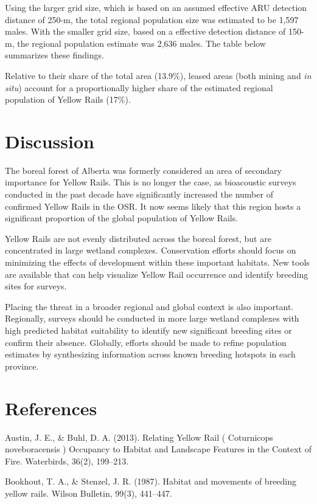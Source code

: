 \documentclass[11pt,]{article}
\begin{document}
Using the larger grid size, which is based on an assumed effective ARU
detection distance of 250-m, the total regional population size was
estimated to be 1,597 males. With the smaller grid size, based on a
effective detection distance of 150-m, the regional population estimate
was 2,636 males. The table below summarizes these findings.

Relative to their share of the total area (13.9\%), leased areas (both
mining and \emph{in situ}) account for a proportionally higher share of
the estimated regional population of Yellow Rails (17\%).

\section{Discussion}\label{discussion}

The boreal forest of Alberta was formerly considered an area of
secondary importance for Yellow Rails. This is no longer the case, as
bioacoustic surveys conducted in the past decade have significantly
increased the number of confirmed Yellow Rails in the OSR. It now seems
likely that this region hosts a significant proportion of the global
population of Yellow Rails.

Yellow Rails are not evenly distributed across the boreal forest, but
are concentrated in large wetland complexes. Conservation efforts should
focus on minimizing the effects of development within these important
habitats. New tools are available that can help visualize Yellow Rail
occurrence and identify breeding sites for surveys.

Placing the threat in a broader regional and global context is also
important. Regionally, surveys should be conducted in more large wetland
complexes with high predicted habitat suitability to identify new
significant breeding sites or confirm their absence. Globally, efforts
should be made to refine population estimates by synthesizing
information across known breeding hotspots in each province.

\section{References}\label{references}

Austin, J. E., \& Buhl, D. A. (2013). Relating Yellow Rail ( Coturnicops
noveboracensis ) Occupancy to Habitat and Landscape Features in the
Context of Fire. Waterbirds, 36(2), 199--213.

Bookhout, T. A., \& Stenzel, J. R. (1987). Habitat and movements of
breeding yellow rails. Wilson Bulletin, 99(3), 441--447.
\end{document}
